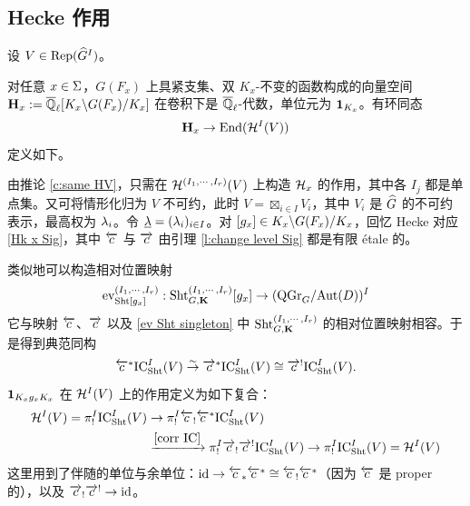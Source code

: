 
\subsection{Hecke 作用}

设 $V\in \textup{Rep}(\widehat{G}^{I})$。

\ssszh{}
对任意 $x\in \Sigma$，$G(F_{x})$ 上具紧支集、双 $K_{x}$-不变的函数构成的向量空间 $\mathbf{H}_{x}:=\overline{\mathbb{Q}}_\ell[K_{x}\backslash G(F_{x})/K_{x}]$ 在卷积下是 $\overline{\mathbb{Q}}_\ell$-代数，单位元为 $\mathbf{1}_{K_{x}}$。有环同态
\begin{equation*}
\mathbf{H}_{x}\to \textup{End}(\mathcal{H}^{I}(V))
\end{equation*}
定义如下。

由推论 \ref{c:same HV}，只需在 $\mathcal{H}^{(I_{1},\cdots, I_{r})}(V)$ 上构造 $\mathcal{H}_{x}$ 的作用，其中各 $I_{j}$ 都是单点集。又可将情形化归为 $V$ 不可约，此时 $V=\boxtimes_{i\in I}V_{i}$，其中 $V_{i}$ 是 $\widehat{G}$ 的不可约表示，最高权为 $\lambda_{i}$。令 $\underline{\lambda}=(\lambda_{i})_{i\in I}$。对 $[g_{x}]\in K_{x}\backslash G(F_{x})/K_{x}$，回忆 Hecke 对应 \eqref{Hk x Sig}，其中 $\overleftarrow{c}$ 与 $\overrightarrow{c}$ 由引理 \ref{l:change level Sig} 都是有限 étale 的。

类似地可以构造相对位置映射
\begin{equation*}
\textup{ev}_{\textup{Sht}[g_{x}]}^{(I_{1},\cdots, I_{r})}: \textup{Sht}^{(I_{1},\cdots, I_{r})}_{G,\mathbf{K}}[g_{x}]\to (\mathrm{QGr}_{G}/\textup{Aut}(D))^{I}
\end{equation*}
它与映射 $\overleftarrow{c}$、$\overrightarrow{c}$ 以及 \eqref{ev Sht singleton} 中 $\textup{Sht}^{(I_{1},\cdots, I_{r})}_{G,\mathbf{K}}$ 的相对位置映射相容。于是得到典范同构
\begin{equation}\label{corr IC}
\overleftarrow{c}^{*}\textup{IC}_{\textup{Sht}}^{I}(V)\stackrel{\sim}{\to} \overrightarrow{c}^{*}\textup{IC}_{\textup{Sht}}^{I}(V)\cong\overrightarrow{c}^{!}\textup{IC}_{\textup{Sht}}^{I}(V).
\end{equation}
$\mathbf{1}_{K_{x}g_{x}K_{x}}$ 在 $\mathcal{H}^{I}(V)$ 上的作用定义为如下复合：
\begin{equation*}
\begin{aligned}
\mathcal{H}^{I}(V)=\pi^{I}_{!}\textup{IC}_{\textup{Sht}}^{I}(V)&\to \pi^{I}_{!}\overleftarrow{c}_{!}\overleftarrow{c}^{*}\textup{IC}_{\textup{Sht}}^{I}(V)\\
&\xrightarrow{\eqref{corr IC}} \pi^{I}_{!}\overrightarrow{c}_{!}\overrightarrow{c}^{!}\textup{IC}_{\textup{Sht}}^{I}(V)\to \pi^{I}_{!}\textup{IC}_{\textup{Sht}}^{I}(V)=\mathcal{H}^{I}(V)
\end{aligned}
\end{equation*}
这里用到了伴随的单位与余单位：$\textup{id} \to \overleftarrow{c}_{*}\overleftarrow{c}^{*}\cong \overleftarrow{c}_{!}\overleftarrow{c}^{*}$（因为 $\overleftarrow{c}$ 是 proper 的），以及 $\overrightarrow{c}_{!}\overrightarrow{c}^{!}\to\textup{id}$。

